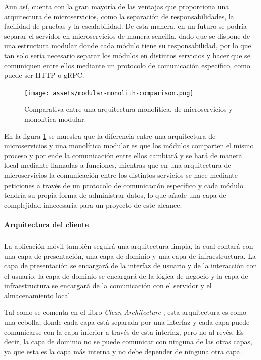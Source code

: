 Aun así, cuenta con la gran mayoría de las ventajas que proporciona una arquitectura de microservicios, como la separación de responsabilidades, la facilidad de pruebas y la escalabilidad.
De esta manera, en un futuro se podría separar el servidor en microservicios de manera sencilla, dado que se dispone de una estructura modular donde cada módulo tiene su responsabilidad, por lo que tan solo sería necesario separar los módulos en distintos servicios y hacer que se comuniquen entre ellos mediante un protocolo de comunicación específico, como puede ser HTTP o gRPC.


\begin{figure}[H]
  \centering
  \texttt{[image: assets/modular-monolith-comparison.png]}
  \caption{Comparativa entre una arquitectura monolítica, de microservicios y monolítica modular. \parencite{tsechelidis2023modular}}
  \label{fig:modular-monolith-comparison}
\end{figure}

En la figura \ref{fig:modular-monolith-comparison} se muestra que la diferencia entre una arquitectura de microservicios y una monolítica modular es que los módulos comparten el mismo proceso y por ende la comunicación entre ellos cambiará y se hará de manera local mediante llamadas a funciones, mientras que en una arquitectura de microservicios la comunicación entre los distintos servicios se hace mediante peticiones a través de un protocolo de comunicación específico y cada módulo tendría su propia forma de administrar datos, lo que añade una capa de complejidad innecesaria para un proyecto de este alcance.

\paragraph{Arquitectura del cliente}
\subparagraph{}
La aplicación móvil también seguirá una arquitectura limpia, la cual contará con una capa de presentación, una capa de dominio y una capa de infraestructura.
La capa de presentación se encargará de la interfaz de usuario y de la interacción con el usuario, la capa de dominio se encargará de la lógica de negocio y la capa de infraestructura se encargará de la comunicación con el servidor y el almacenamiento local.

Tal como se comenta en el libro \textit{Clean Architecture} \parencite{uncle-bob-clean-architecture}, esta arquitectura es como una cebolla, donde cada capa está separada por una interfaz y cada capa puede comunicarse con la capa inferior a través de esta interfaz, pero no al revés.
Es decir, la capa de dominio no se puede comunicar con ninguna de las otras capas, ya que esta es la capa más interna y no debe depender de ninguna otra capa.


